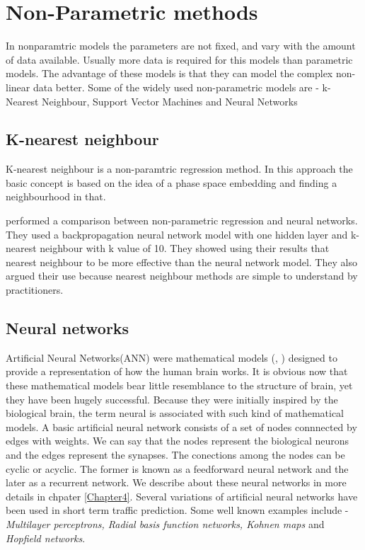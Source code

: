 \section{Non-Parametric methods}
In nonparamtric models the parameters are not fixed, and vary with the amount of data available.
Usually more data is required for this models than parametric models. The advantage of these models
is that they can model the complex non-linear data better. Some of the widely used non-parametric
models are - k-Nearest Neighbour, Support Vector Machines and Neural Networks

\subsection{K-nearest neighbour}
K-nearest neighbour is a non-paramtric regression method. In this approach the basic concept is based
on the idea of a phase space embedding and finding a neighbourhood in that.


\citet{smith1994comparison} performed a comparison between non-parametric regression and neural
networks. They used a backpropagation neural network model with one hidden layer and k-nearest
neighbour with k value of 10. They showed using their results that nearest neighbour to be more
effective than the neural network model. They also argued their use because nearest neighbour methods
are simple to understand by practitioners.

\citet{lv2009real}

\citet{myung2011travel}

\citet{zhang2013improved}

\citet{meng2015two}


\subsection{Neural networks}
\label{subsec:neuralNetworksTrafficPred}
Artificial Neural Networks(ANN) were mathematical models (\citet{mcculloch1943logical},
\citet{rosenblatt1958perceptron}) designed to  provide a representation of how the human brain
works. It is obvious now that these mathematical models bear little resemblance to the structure
of brain, yet they have been hugely successful. Because they were initially inspired by the
biological brain, the term neural is associated with such kind of mathematical models. A basic
artificial neural network consists of a set of nodes connnected by edges with weights. We can say
that the nodes represent the biological neurons and the edges represent the synapses. The
conections among the nodes can be cyclic or acyclic. The former is known as a feedforward neural
network and the later as a recurrent network. We describe about these neural networks in more
details in chpater \ref{Chapter4}. Several variations of artificial neural networks have been
used in short term traffic prediction. Some well known examples include - \textit{Multilayer
perceptrons, Radial basis function networks, Kohnen maps} and \textit{Hopfield networks}.


